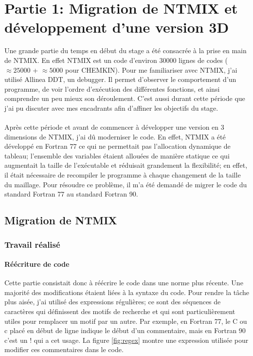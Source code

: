\section{Partie 1: Migration de NTMIX et développement d'une version 3D}
Une grande partie du temps en début du stage a été consacrée à la prise en main de NTMIX. En effet NTMIX est un code d'environ 30000 lignes de codes ($\approx 25000$ + $\approx 5000$ pour CHEMKIN). Pour me familiariser avec NTMIX, j'ai utilisé Allinea DDT, un debugger. Il permet d'observer le comportement d'un programme, de voir l'ordre d'exécution des différentes fonctions, et ainsi comprendre un peu mieux son déroulement. C'est aussi durant cette période que j'ai pu discuter avec mes encadrants afin d'affiner les objectifs du stage.

\paragraph{}
Après cette période et avant de commencer à développer une version en 3 dimensions de NTMIX, j'ai dû moderniser le code. En effet, NTMIX a été développé en Fortran 77 ce qui ne permettait pas l'allocation dynamique de tableau; l'ensemble des variables étaient allouées de manière statique ce qui augmentait la taille de l'exécutable et réduisait grandement la flexibilité; en effet, il était nécessaire de recompiler le programme à chaque changement de la taille du maillage. Pour résoudre ce problème, il m'a été demandé de migrer le code du standard Fortran 77 au standard Fortran 90.

\subsection{Migration de NTMIX}
\subsubsection{Travail réalisé}

\paragraph{Réécriture de code}Cette partie consistait donc à réécrire le code dans une norme plus récente. Une majorité des modifications étaient liées à la syntaxe du code. Pour rendre la tâche plus aisée, j'ai utilisé des expressions régulières; ce sont des séquences de caractères qui définissent des motifs de recherche et qui sont particulièrement utiles pour remplacer un motif par un autre. Par exemple, en Fortran 77, le C ou c placé en début de ligne indique le début d'un commentaire, mais en Fortran 90 c'est un ! qui a cet usage. La figure \ref{fig:regex} montre une expression utilisée pour modifier ces commentaires dans le code.

